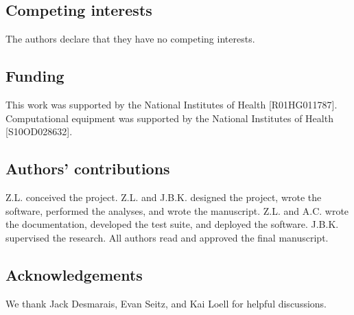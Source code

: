 \documentclass[pdflatex,sn-vancouver-num,referee,oneside]{sn-jnl}
\begin{document}
\subsection*{Competing interests}
The authors declare that they have no competing interests.

\subsection*{Funding}
This work was supported by the National Institutes of Health [R01HG011787]. Computational equipment was supported by the National Institutes of Health [S10OD028632].

\subsection*{Authors' contributions}
Z.L. conceived the project. Z.L. and J.B.K. designed the project, wrote the software, performed the analyses, and wrote the manuscript. Z.L. and A.C. wrote the documentation, developed the test suite, and deployed the software. J.B.K. supervised the research. All authors read and approved the final manuscript.

\subsection*{Acknowledgements}
We thank Jack Desmarais, Evan Seitz, and Kai Loell for helpful discussions.


\end{document}
